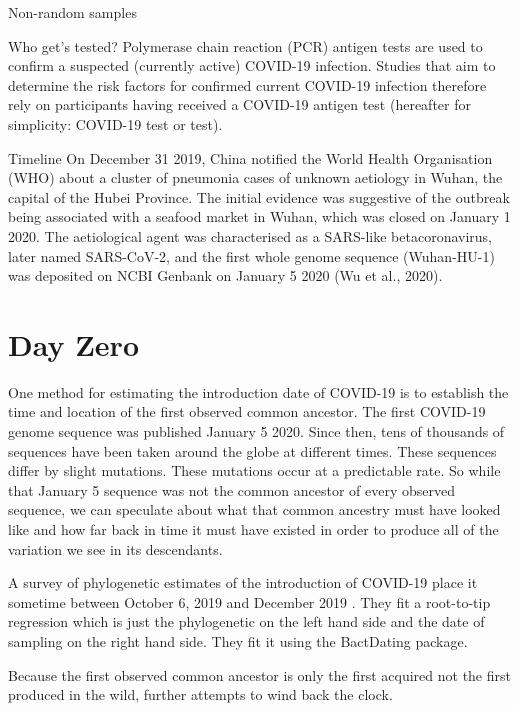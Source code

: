 \documentclass[
]{book}
\begin{document}
Non-random samples \citep{griffithColliderBiasUndermines2020}

Who get's tested?
Polymerase chain reaction (PCR) antigen tests are used to confirm a suspected (currently
active) COVID-19 infection. Studies that aim to determine the risk factors for confirmed current
COVID-19 infection therefore rely on participants having received a COVID-19 antigen test
(hereafter for simplicity: COVID-19 test or test).

Timeline
On December 31 2019, China notified the World Health Organisation (WHO) about a cluster of pneumonia cases of unknown aetiology in Wuhan, the capital of the Hubei Province.
The initial evidence was suggestive of the outbreak being associated with a seafood market in Wuhan, which was closed on January 1 2020.
The aetiological agent was characterised as a SARS-like betacoronavirus, later named SARS-CoV-2, and the first whole genome sequence (Wuhan-HU-1) was deposited on NCBI Genbank on January 5 2020 (Wu et al., 2020).

\hypertarget{day-zero}{%
\chapter{Day Zero}\label{day-zero}}

One method for estimating the introduction date of COVID-19 is to establish the time and location of the first observed common ancestor. The first COVID-19 genome sequence was published January 5 2020. Since then, tens of thousands of sequences have been taken around the globe at different times. These sequences differ by slight mutations. These mutations occur at a predictable rate. So while that January 5 sequence was not the common ancestor of every observed sequence, we can speculate about what that common ancestry must have looked like and how far back in time it must have existed in order to produce all of the variation we see in its descendants.

A survey of phylogenetic estimates of the introduction of COVID-19 place it sometime between October 6, 2019 and December 2019 \citep{vandorpEmergenceGenomicDiversity2020}. They fit a root-to-tip regression which is just the phylogenetic on the left hand side and the date of sampling on the right hand side. They fit it using the BactDating package.

Because the first observed common ancestor is only the first acquired not the first produced in the wild, further attempts to wind back the clock.
\end{document}
